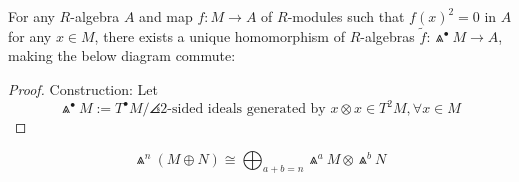 \begin{thm}
    For any $R$-algebra $A$ and map $f : M \to A$ of $R$-modules such that $f(x)^2=0$ in $A$ for any $x \in M$, there exists a unique homomorphism of $R$-algebras $\tilde f : \Wedge ^\bullet M \to A$, making the below diagram commute:

\end{thm}

\begin{proof}
    Construction: Let
    $$\Wedge ^\bullet M := T^\bullet M / \angles{ 2\text{-sided ideals generated by }x \otimes x \in T^2M, \forall x \in M }$$
\end{proof}

\begin{prop}
    $$\Wedge^n(M \oplus N) \cong \bigoplus _{a+b=n}\Wedge^aM \otimes \Wedge ^bN$$
\end{prop}

